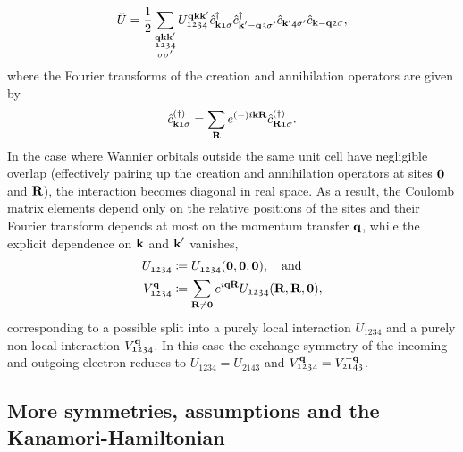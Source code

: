 \documentclass[../../main.tex]{subfiles}
\begin{document}
\begin{align}
	\hat U=\frac 12 \sum_{\substack{\textbf{qkk}'\\ \mathfrak{1234}\\\sigma\sigma'}}U_{\mathfrak{1234}}^{\textbf{qkk}'}\hat c^{\dagger}_{\textbf{k}\mathfrak{1}\sigma} \hat c^{\dagger}_{\textbf{k}'-\textbf{q} \mathfrak{3}\sigma'} \hat c_{\textbf{k}'\mathfrak{4}\sigma'} \hat c_{\textbf{k}-\textbf{q}\mathfrak{2}\sigma},
\end{align}
where the Fourier transforms of the creation and annihilation operators are given by
\begin{align}
	\hat c^{(\dagger)}_{\textbf{k}\mathfrak{1}\sigma}=\sum_{\textbf{R}}e^{(-)i\textbf{kR}}\hat c^{(\dagger)}_{\textbf{R}\mathfrak{1}\sigma}.
\end{align}
In the case where Wannier orbitals outside the same unit cell have negligible overlap (effectively pairing up the creation and annihilation operators at sites $\textbf{0}$ and $\textbf{R}$), the interaction becomes diagonal in real space. As a result, the Coulomb matrix elements depend only on the relative positions of the sites and their Fourier transform depends at most on the momentum transfer $\textbf{q}$, while the explicit dependence on $\textbf{k}$ and $\textbf{k}'$ vanishes,
\begin{subequations}\label{eq:interaction_fourier_transform}
\begin{align}
	U_{\mathfrak{1234}}&\coloneq U_{\mathfrak{1234}}(\textbf{0},\textbf{0},\textbf{0}),\quad\text{and}\\
	V^{\textbf{q}}_{\mathfrak{1234}}&\coloneq\sum_{\textbf{R}\neq\textbf{0}}e^{i\textbf{qR}}U_{\mathfrak{1234}}(\textbf{R},\textbf{R},\textbf{0}),
\end{align}
\end{subequations}
corresponding to a possible split into a purely local interaction $U_{\mathfrak{1234}}$ and a purely non-local interaction $V^{\textbf{q}}_{\mathfrak{1234}}$. In this case the exchange symmetry of the incoming and outgoing electron reduces to $U_{\mathfrak{1234}}=U_{\mathfrak{2143}}$ and $V^{\textbf{q}}_{\mathfrak{1234}}=V^{-\textbf{q}}_{\mathfrak{2143}}$.

\subsection{More symmetries, assumptions and the Kanamori-Hamiltonian}
\end{document}
